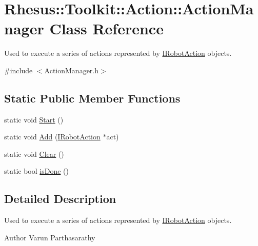 \hypertarget{class_rhesus_1_1_toolkit_1_1_action_1_1_action_manager}{\section{Rhesus\-:\-:Toolkit\-:\-:Action\-:\-:Action\-Manager Class Reference}
\label{class_rhesus_1_1_toolkit_1_1_action_1_1_action_manager}
}


Used to execute a series of actions represented by \hyperlink{class_rhesus_1_1_toolkit_1_1_action_1_1_i_robot_action}{I\-Robot\-Action} objects.  




{\ttfamily \#include $<$Action\-Manager.\-h$>$}

\subsection*{Static Public Member Functions}
\begin{DoxyCompactItemize}
\item 
static void \hyperlink{class_rhesus_1_1_toolkit_1_1_action_1_1_action_manager_a0a9349399d5990e37da78facb58131b8}{Start} ()
\item 
static void \hyperlink{class_rhesus_1_1_toolkit_1_1_action_1_1_action_manager_a55495a1b1869e61f8901295a9818a11a}{Add} (\hyperlink{class_rhesus_1_1_toolkit_1_1_action_1_1_i_robot_action}{I\-Robot\-Action} $\ast$act)
\item 
static void \hyperlink{class_rhesus_1_1_toolkit_1_1_action_1_1_action_manager_a4497efe142bd8cf1ba7c635dd6a839cb}{Clear} ()
\item 
static bool \hyperlink{class_rhesus_1_1_toolkit_1_1_action_1_1_action_manager_a1593cd5e491af1fc9b679a4b682039ac}{is\-Done} ()
\end{DoxyCompactItemize}


\subsection{Detailed Description}
Used to execute a series of actions represented by \hyperlink{class_rhesus_1_1_toolkit_1_1_action_1_1_i_robot_action}{I\-Robot\-Action} objects. 

\begin{DoxyAuthor}{Author}
Varun Parthasarathy 
\end{DoxyAuthor}


